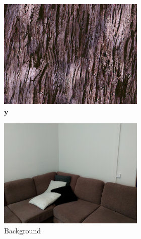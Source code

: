 \begin{figure}[]
    \begin{subfigure}{\textwidth}
        \centering
        \begin{subfigure}{0.24\textwidth}
            \centering
            \includegraphics[width=\textwidth]{images/04-experiment02/sofa/wood/target.jpg}
            \caption*{\(\bm{y}\)}
        \end{subfigure}
        \hfill
        \begin{subfigure}{0.24\textwidth}
            \centering
            \includegraphics[width=\textwidth]{images/04-experiment02/sofa/bg.jpg}
            \caption*{Background}
        \end{subfigure}
        \hfill
        \begin{subfigure}{0.24\textwidth}

\end{subfigure}
\end{subfigure}
\end{figure}
